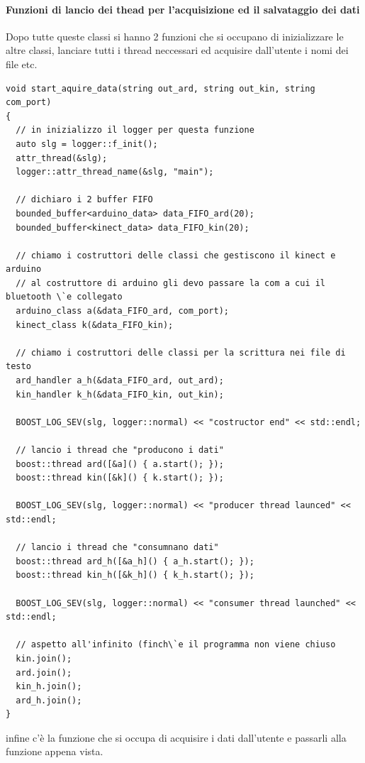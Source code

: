 \documentclass[10pt,a4paper]{article}
\begin{document}
\paragraph{Funzioni di lancio dei thead per l'acquisizione ed il salvataggio dei dati}
Dopo tutte queste classi si hanno 2 funzioni che si occupano di inizializzare le altre classi, lanciare tutti i thread neccessari ed acquisire dall'utente i nomi dei file etc.
\begin{lstlisting}[style=mycpp, caption=librerie usate, captionpos=b]
void start_aquire_data(string out_ard, string out_kin, string com_port)
{
  // in inizializzo il logger per questa funzione
  auto slg = logger::f_init();
  attr_thread(&slg);
  logger::attr_thread_name(&slg, "main");

  // dichiaro i 2 buffer FIFO
  bounded_buffer<arduino_data> data_FIFO_ard(20);
  bounded_buffer<kinect_data> data_FIFO_kin(20);

  // chiamo i costruttori delle classi che gestiscono il kinect e arduino
  // al costruttore di arduino gli devo passare la com a cui il bluetooth \`e collegato
  arduino_class a(&data_FIFO_ard, com_port);
  kinect_class k(&data_FIFO_kin);

  // chiamo i costruttori delle classi per la scrittura nei file di testo
  ard_handler a_h(&data_FIFO_ard, out_ard);
  kin_handler k_h(&data_FIFO_kin, out_kin);

  BOOST_LOG_SEV(slg, logger::normal) << "costructor end" << std::endl;

  // lancio i thread che "producono i dati"
  boost::thread ard([&a]() { a.start(); });
  boost::thread kin([&k]() { k.start(); });

  BOOST_LOG_SEV(slg, logger::normal) << "producer thread launced" << std::endl;

  // lancio i thread che "consumnano dati"
  boost::thread ard_h([&a_h]() { a_h.start(); });
  boost::thread kin_h([&k_h]() { k_h.start(); });

  BOOST_LOG_SEV(slg, logger::normal) << "consumer thread launched" << std::endl;

  // aspetto all'infinito (finch\`e il programma non viene chiuso
  kin.join();
  ard.join();
  kin_h.join();
  ard_h.join();
}
\end{lstlisting}
%
%
infine c'\`e la funzione che si occupa di acquisire i dati dall'utente e passarli alla funzione appena vista.
\end{document}
